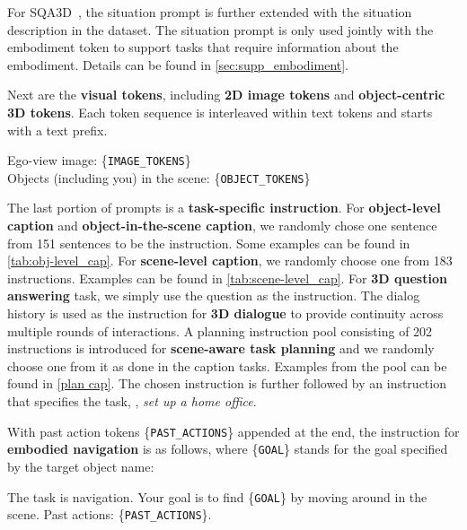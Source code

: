 For SQA3D~\citep{ma2023sqa3d}, the situation prompt is further extended with the situation description in the dataset. The situation prompt is only used jointly with the embodiment token to support tasks that require information about the embodiment. Details can be found in \cref{sec:supp_embodiment}.

Next are the \textbf{visual tokens}, including \textbf{2D image tokens} and \textbf{object-centric 3D tokens}. Each token sequence is interleaved within text tokens and starts with a text prefix.
\begin{tcolorbox}
\begin{minipage}{\linewidth}
Ego-view image: \{\texttt{IMAGE\_TOKENS}\} \\
Objects (including you) in the scene: \{\texttt{OBJECT\_TOKENS}\}
\end{minipage}
\end{tcolorbox}

The last portion of prompts is a \textbf{task-specific instruction}. For \textbf{object-level caption} and \textbf{object-in-the-scene caption}, we randomly chose one sentence from 151 sentences to be the instruction. Some examples can be found in \cref{tab:obj-level_cap}. For \textbf{scene-level caption}, we randomly choose one from 183 instructions. Examples can be found in \cref{tab:scene-level_cap}. For \textbf{3D question answering} task, we simply use the question as the instruction. The dialog history is used as the instruction for \textbf{3D dialogue} to provide continuity across multiple rounds of interactions. A planning instruction pool consisting of 202 instructions is introduced for \textbf{scene-aware task planning} and we randomly choose one from it as done in the caption tasks. Examples from the pool can be found in \cref{plan cap}. The chosen instruction is further followed by an instruction that specifies the task, \eg, \textit{set up a home office}.

With past action tokens \{\texttt{PAST\_ACTIONS}\} appended at the end, the instruction for \textbf{embodied navigation} is as follows, where \{\texttt{GOAL}\} stands for the goal specified by the target object name:
\begin{tcolorbox}
\begin{minipage}{\linewidth}
The task is navigation. Your goal is to find \{\texttt{GOAL}\} by moving around in the scene. Past actions: \{\texttt{PAST\_ACTIONS}\}.
\end{minipage}
\end{tcolorbox}

